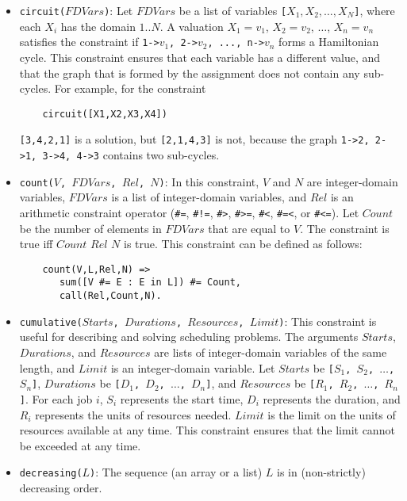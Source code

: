 \begin{itemize}
\item \texttt{circuit($FDVars$)}: Let $FDVars$ be a list of variables \texttt{[$X_1,X_2,\ldots,X_N$]}, where each \texttt{$X_i$} has the domain $1..N$. A valuation $X_1=v_1$, $X_2=v_2$, $\ldots$, $X_n=v_n$ satisfies the constraint if \texttt{1->$v_1$, 2->$v_2$, ..., n->$v_n$} forms a Hamiltonian cycle. This constraint ensures that each variable has a different value, and that the graph that is formed by the assignment does not contain any sub-cycles. For example, for the constraint 
\begin{verbatim}
    circuit([X1,X2,X3,X4])
\end{verbatim}
\texttt{[3,4,2,1]} is a solution, but \texttt{[2,1,4,3]} is not, because the graph \texttt{1->2, 2->1, 3->4, 4->3} contains two sub-cycles.
\item \texttt{count($V$, $FDVars$, $Rel$, $N$)}:  In this constraint, $V$ and $N$ are integer-domain variables, $FDVars$ is a list of integer-domain variables, and $Rel$ is an arithmetic constraint operator (\verb+#=+,  \verb+#!=+,  \verb+#>+,  \verb+#>=+,  \verb+#<+,  \verb+#=<+, or \verb+#<=+). Let $Count$ be the number of elements in $FDVars$ that are equal to $V$. The constraint is true iff $Count$ $Rel$ $N$ is true. This constraint can be defined as follows:
\begin{verbatim}
    count(V,L,Rel,N) =>
       sum([V #= E : E in L]) #= Count,
       call(Rel,Count,N).
\end{verbatim}

\item \texttt{cumulative($Starts$, $Durations$, $Resources$, $Limit$)}: This constraint is useful for describing and solving scheduling problems. The arguments $Starts$, $Durations$, and $Resources$ are lists of integer-domain variables of the same length, and $Limit$ is an integer-domain variable. Let $Starts$ be \texttt{[$S_1$, $S_2$, $\ldots$, $S_n$]}, $Durations$ be \texttt{[$D_1$, $D_2$, $\ldots$, $D_n$]}, and $Resources$ be \texttt{[$R_1$, $R_2$, $\ldots$, $R_n$]}. For each job \texttt{$i$}, \texttt{$S_i$} represents the start time, \texttt{$D_i$} represents the duration, and \texttt{$R_i$} represents the units of resources needed. $Limit$ is the limit on the units of resources available at any time. This constraint ensures that the limit cannot be exceeded at any time.

\item \texttt{decreasing($L$)}: The sequence (an array or a list) $L$ is in (non-strictly) decreasing order.


\end{itemize}
